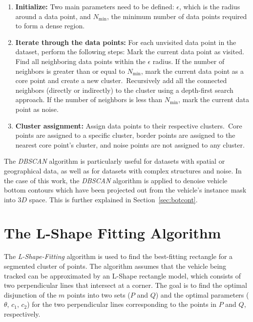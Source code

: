 \begin{enumerate}
    \item \textbf{Initialize:} Two main parameters need to be defined: $\epsilon$, which is the radius around a data point, and $N_\text{min}$, the minimum number of data points required to form a dense region.
    \item \textbf{Iterate through the data points:} For each unvisited data point in the dataset, perform the following steps:
    \subitem Mark the current data point as visited.
    \subitem Find all neighboring data points within the $\epsilon$ radius.
    \subitem If the number of neighbors is greater than or equal to $N_\text{min}$, mark the current data point as a core point and create a new cluster.\ Recursively add all the connected neighbors (directly or indirectly) to the cluster using a depth-first search approach.
    \subitem If the number of neighbors is less than $N_\text{min}$, mark the current data point as noise.
    \item \textbf{Cluster assignment:} Assign data points to their respective clusters.\ Core points are assigned to a specific cluster, border points are assigned to the nearest core point's cluster, and noise points are not assigned to any cluster.
\end{enumerate}

The \textit{DBSCAN} algorithm is particularly useful for datasets with spatial or geographical data, as well as for datasets with complex structures and noise.
In the case of this work, the \textit{DBSCAN} algorithm is applied to denoise vehicle bottom contours which have been projected out from the vehicle's instance mask into $3D$ space.
This is further explained in Section~\ref{sec:botcont}.


\section{The L-Shape Fitting Algorithm}
\label{sec:lshapefitting}

The \textit{L-Shape-Fitting} algorithm is used to find the best-fitting rectangle for a segmented cluster of points.
The algorithm assumes that the vehicle being tracked can be approximated by an L-Shape rectangle model, which consists of two perpendicular lines that intersect at a corner.
The goal is to find the optimal disjunction of the $m$ points into two sets ($P$ and $Q$) and the optimal parameters ($\theta$, $c_1$, $c_2$) for the two perpendicular lines corresponding to the points in $P$ and $Q$, respectively.

